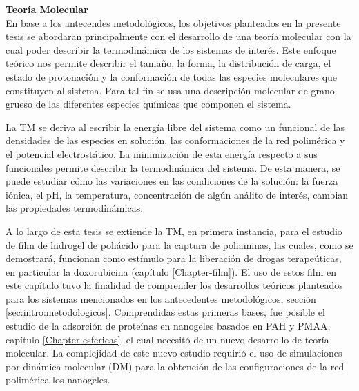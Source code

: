\textbf{Teor\'ia Molecular}\\
En base a los antecendes metodol\'ogicos, los objetivos planteados en la presente tesis se abordaran principalmente con el desarrollo de una teor\'ia molecular con la cual poder describir la termodin\'amica de los sistemas de inter\'es.
Este enfoque te\'orico nos permite describir el tama\~no, la forma, la distribuci\'on de carga, el estado de protonaci\'on y la conformaci\'on de todas las especies moleculares que constituyen al sistema.  Para tal fin se usa una descripci\'on molecular de grano grueso de las diferentes especies qu\'imicas que componen el sistema. 

La TM se deriva al escribir la energ\'ia libre del sistema como un funcional de las densidades de las especies en soluci\'on, las conformaciones de la red polim\'erica y el potencial electrost\'atico.
La minimizaci\'on de esta energ\'ia respecto a sus funcionales permite describir la termodin\'amica del sistema.
De esta manera, se puede estudiar c\'omo las variaciones en las condiciones de la soluci\'on: la fuerza i\'onica, el pH, la temperatura, concentraci\'on de alg\'un an\'alito de inter\'es, cambian las propiedades termodin\'amicas.

A lo largo de esta tesis se extiende la TM, en primera instancia, para el estudio de film de hidrogel  de poli\'acido para la captura de poliaminas, las cuales, como se demostrar\'a, funcionan como est\'imulo para la liberaci\'on de drogas terape\'uticas, en particular la doxorubicina (cap\'itulo \ref{Chapter-film}).
El uso de estos film en este cap\'itulo tuvo la finalidad de comprender los desarrollos te\'oricos planteados para los sistemas mencionados en los antecedentes metodol\'ogicos, secci\'on \ref{sec:intro:metodologicos}.
Comprendidas estas primeras bases, fue posible el estudio de la adsorci\'on de prote\'inas en nanogeles basados en PAH y PMAA, cap\'itulo \ref{Chapter-esfericas},  el cual necesit\'o de un nuevo desarrollo de teor\'ia molecular.
La complejidad de este nuevo estudio requiri\'o el uso de simulaciones por din\'amica molecular (DM)  para la obtenci\'on de las configuraciones de la red polim\'erica  los nanogeles.


